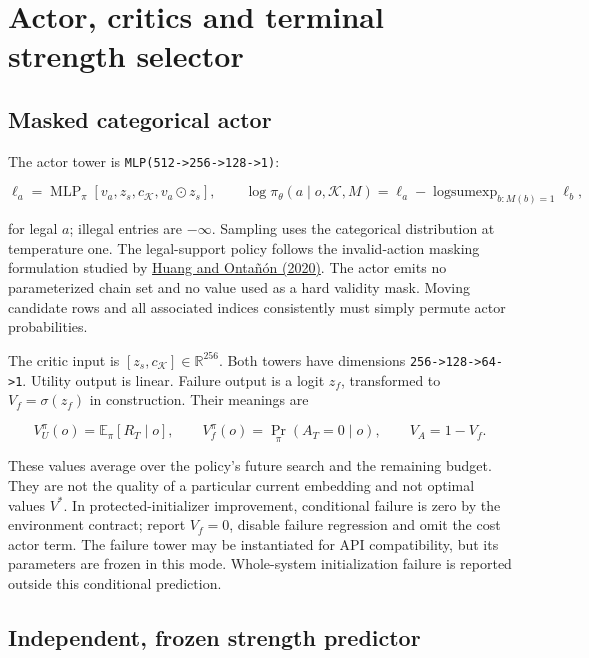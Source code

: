 \documentclass[10pt,a4paper]{article}
\begin{document}
\hypertarget{actor-critics-and-terminal-strength-selector}{%
\section{Actor, critics and terminal strength
selector}\label{actor-critics-and-terminal-strength-selector}}

\hypertarget{masked-categorical-actor}{%
\subsection{Masked categorical actor}\label{masked-categorical-actor}}

The actor tower is
\texttt{MLP(512-\textgreater{}256-\textgreater{}128-\textgreater{}1)}:

\[
\ell_a=\operatorname{MLP}_\pi[v_a,z_s,c_{\mathcal K},v_a\odot z_s],
\qquad
\log\pi_\theta(a\mid o,\mathcal K,M)
=\ell_a-\operatorname{logsumexp}_{b:M(b)=1}\ell_b,
\tag{15}
\]

for legal \(a\); illegal entries are \(-\infty\). Sampling uses the
categorical distribution at temperature one. The legal-support policy
follows the invalid-action masking formulation studied by
\href{https://arxiv.org/abs/2006.14171}{Huang and Ontañón (2020)}. The
actor emits no parameterized chain set and no value used as a hard
validity mask. Moving candidate rows and all associated indices
consistently must simply permute actor probabilities.

The critic input is \([z_s,c_{\mathcal K}]\in\mathbb R^{256}\). Both
towers have dimensions
\texttt{256-\textgreater{}128-\textgreater{}64-\textgreater{}1}. Utility
output is linear. Failure output is a logit \(z_f\), transformed to
\(V_f=\sigma(z_f)\) in construction. Their meanings are

\[
V_U^\pi(o)=\mathbb E_\pi[R_T\mid o],\qquad
V_f^\pi(o)=\Pr_\pi(A_T=0\mid o),\qquad V_A=1-V_f.
\tag{16}
\]

These values average over the policy's future search and the remaining
budget. They are not the quality of a particular current embedding and
not optimal values \(V^*\). In protected-initializer improvement,
conditional failure is zero by the environment contract; report
\(V_f=0\), disable failure regression and omit the cost actor term. The
failure tower may be instantiated for API compatibility, but its
parameters are frozen in this mode. Whole-system initialization failure
is reported outside this conditional prediction.

\hypertarget{independent-frozen-strength-predictor}{%
\subsection{Independent, frozen strength
predictor}\label{independent-frozen-strength-predictor}}
\end{document}
